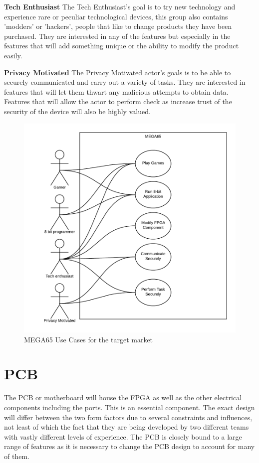 \textbf{Tech Enthusiast}
The Tech Enthusiast's goal is to try new technology and experience rare or peculiar technological devices, this group also contains 'modders' or 'hackers', people that like to change products they have been purchased. They are interested in any of the features but especially in the features that will add something unique or the ability to modify the product easily.

\textbf{Privacy Motivated}
The Privacy Motivated actor's goals is to be able to securely communicated and carry out a variety of tasks. They are interested in features that will let them thwart any malicious attempts to obtain data. Features that will allow the actor to perform check as increase trust of the security of the device will also be highly valued. 

\begin{figure} \begin{center}
\includegraphics[width=.6\linewidth]{pics/MEGA65_use_case} 
\end{center} 
\caption{MEGA65 Use Cases for the target market\\}
\label{MEGA65_use_cases}
\end{figure}

\section{PCB}
The PCB or motherboard will house the FPGA as well as the other electrical components including the ports. This is an essential component. The exact design  will differ between the two form factors due to several constraints and influences, not least of which the fact that they are being developed by two different teams with vastly different levels of experience. The PCB is closely bound to a large range of features as it is necessary to change the PCB design to account for many of them.

